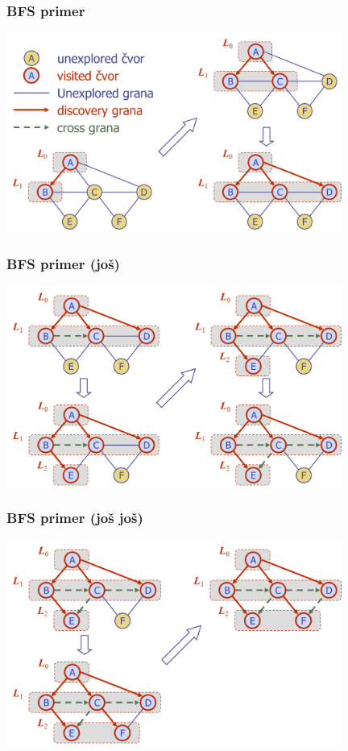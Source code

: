 \documentclass[compress]{beamer}
\begin{document}
\begin{frame}[fragile]
  \frametitle{BFS primer}
  \begin{center}
    \includegraphics[width=11cm]{asp-14-pic22.png}
  \end{center}
\end{frame}

\begin{frame}[fragile]
  \frametitle{BFS primer (još)}
  \begin{center}
    \includegraphics[width=11cm]{asp-14-pic23.png}
  \end{center}
\end{frame}

\begin{frame}[fragile]
  \frametitle{BFS primer (još još)}
  \begin{center}
    \includegraphics[width=11cm]{asp-14-pic24.png}
  \end{center}
\end{frame}
\end{document}
